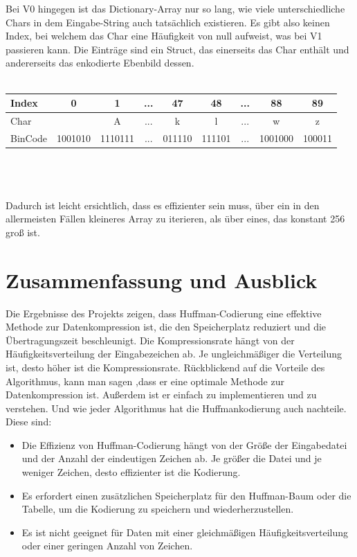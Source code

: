 \documentclass[course=erap]{aspdoc}
\begin{document}
Bei V0 hingegen ist das Dictionary-Array nur so lang, wie viele unterschiedliche Chars in dem Eingabe-String auch tatsächlich existieren. Es gibt also keinen Index, bei welchem das Char eine Häufigkeit von null aufweist, was bei V1 passieren kann. Die Einträge sind ein Struct, das einerseits das Char enthält und andererseits das enkodierte Ebenbild dessen.\\\\
\begin{tabular}[h]{||l|c|c|c|c|c|c|c|c||}
\hline
\rowcolor[gray]{.9}Index & 0 & 1  & ... & 47 & 48 & ...&88 & 89 \\
\hline
Char&   & A  & ...& k &  l  & ... & w & z   \\
\hline
BinCode& 1001010 &  1110111  & ... &   011110 &  111101 & ... &  1001000 & 100011   \\
\hline
\end{tabular}\\\\\\
Dadurch ist leicht ersichtlich, dass es effizienter sein muss, über ein in den allermeisten Fällen kleineres Array zu iterieren, als über eines, das konstant 256 groß ist.


 

\section{Zusammenfassung und Ausblick}
Die Ergebnisse des Projekts zeigen, dass Huffman-Codierung eine effektive Methode zur Datenkompression ist, die den Speicherplatz reduziert und die Übertragungszeit beschleunigt. Die Kompressionsrate hängt von der Häufigkeitsverteilung der Eingabezeichen ab. Je ungleichmäßiger die Verteilung ist, desto höher ist die Kompressionsrate. Rückblickend auf die Vorteile des Algorithmus, kann man sagen ,dass er eine optimale Methode zur Datenkompression ist. Außerdem ist er einfach zu implementieren und zu verstehen.
Und wie jeder Algorithmus hat die Huffmankodierung auch nachteile. Diese sind:
\begin{itemize}
\item Die Effizienz von Huffman-Codierung hängt von der Größe der Eingabedatei und der Anzahl der eindeutigen Zeichen ab. Je größer die Datei und je weniger Zeichen, desto effizienter ist die Kodierung.
\item Es erfordert einen zusätzlichen Speicherplatz für den Huffman-Baum oder die Tabelle, um die Kodierung zu speichern und wiederherzustellen.
\item Es ist nicht geeignet für Daten mit einer gleichmäßigen Häufigkeitsverteilung oder einer geringen Anzahl von Zeichen.
\end{itemize}


{}
\end{document}
